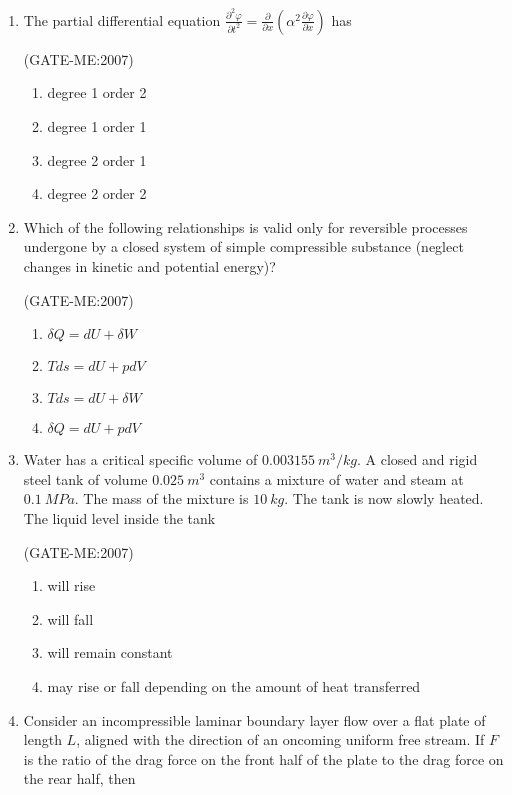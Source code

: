 \documentclass[journal,12pt,onecolumn]{IEEEtran}
\theoremstyle{remark}
\begin{document}
\begin{enumerate}
\item The partial differential equation
$\frac{\partial^2 \varphi}{\partial t^2} = \frac{\partial}{\partial x} \left( \alpha^2 \frac{\partial \varphi}{\partial x} \right)$ has

		\hfill{(GATE-ME:2007)}
\begin{multicols}{2}
\begin{enumerate}
    \item degree 1 order 2
    \item degree 1 order 1
    \item degree 2 order 1
    \item degree 2 order 2
\end{enumerate}
\end{multicols}

\item Which of the following relationships is valid only for reversible processes undergone by a closed system of simple compressible substance (neglect changes in kinetic and potential energy)?

	\hfill{(GATE-ME:2007)}
		\begin{multicols}{2}
\begin{enumerate}
    \item $\delta Q = dU + \delta W$
    \item $T ds = dU + p dV$
    \item $T ds = dU + \delta W$
    \item $\delta Q = dU + p dV$
\end{enumerate}
\end{multicols}

\item Water has a critical specific volume of $0.003155 \ m^3/kg$. A closed and rigid steel tank of volume $0.025 \ m^3$ contains a mixture of water and steam at $0.1 \ MPa$. The mass of the mixture is $10 \ kg$. The tank is now slowly heated. The liquid level inside the tank

	\hfill{(GATE-ME:2007)}
	\begin{enumerate}
    \item will rise
    \item will fall
    \item will remain constant
    \item may rise or fall depending on the amount of heat transferred
\end{enumerate}

  \item Consider an incompressible laminar boundary layer flow over a flat plate of length $L$, aligned with the direction of an oncoming uniform free stream. If $F$ is the ratio of the drag force on the front half of the plate to the drag force on the rear half, then


\end{enumerate}
\end{document}

